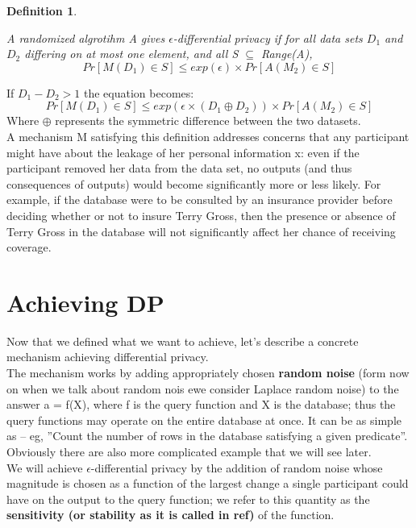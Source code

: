 \documentclass{article}
\newtheorem{defn}[thm]{Definition}
\newenvironment{definition}{\begin{defn}\begin{em}}%
{\end{em}\end{defn}}
\begin{document}
\begin{definition}
A randomized algrotihm A gives $\epsilon$-differential privacy if for all
data sets $D_1$ and $D_2$ differing on at most one element, and all S $\subseteq$ Range(A),
\begin{equation}
Pr[M(D_1) \in S] \leq exp(\epsilon) \times Pr[A(M_2) \in S]
\end{equation}
\end{definition}

If $D_1 - D_2 > 1$ the equation becomes:
\begin{equation}
Pr[M(D_1) \in S] \leq exp(\epsilon \times (D_1 \oplus D_2) ) \times Pr[A(M_2) \in S]
\end{equation}
Where $\oplus$ represents the symmetric difference between the two datasets.\\
A mechanism M satisfying this definition addresses concerns that any participant
might have about the leakage of her personal information x: even if the participant
removed her data from the data set, no outputs (and thus consequences
of outputs) would become significantly more or less likely. For example, if the
database were to be consulted by an insurance provider before deciding whether
or not to insure Terry Gross, then the presence or absence of Terry Gross in the
database will not significantly affect her chance of receiving coverage.


\section{Achieving DP}
Now that we defined what we want to achieve, let's describe a concrete mechanism achieving differential privacy.\\
The mechanism works by adding appropriately chosen \textbf{random noise} (form now on when we talk about random nois ewe consider Laplace random noise) to
the answer a = f(X), where f is the query function and X is the database; thus
the query functions may operate on the entire database at once. It can be as simple as
– eg, ''Count the number of rows in the database satisfying a given predicate''. Obviously there are also more complicated example that we will see later.\\

We will achieve $\epsilon$-differential privacy by the addition of random noise whose
magnitude is chosen as a function of the largest change a single participant
could have on the output to the query function; we refer to this quantity as the
\textbf{sensitivity (or stability as it is called in ref)} of the function.
\end{document}
